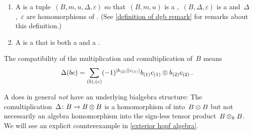 \documentclass[a4paper,10pt,headings=standardclasses]{scrartcl}
\begin{document}
\begin{definition}
  \label{definition of dgb}
  \leavevmode
  \begin{enumerate}
    \item
      A  is a tuple~$(B, m, u, \Delta, \varepsilon)$ so that~$(B, m, u)$ is a {\dga},~$(B, \Delta, \varepsilon)$ is a {\dgc} and~$\Delta$,~$\varepsilon$ are homomorphisms of {\dgas}.
      (See \cref{definition of dgb remark} for remarks about this definition.)
    \item
      A  is a {\dgsub} that is both a {\dgi} and a {\dgci}.
  \end{enumerate}
\end{definition}

\begin{remark}
  The compatibility of the multiplication and comultiplication of~$B$ means
  \begin{gather*}
    \Delta(bc)
    =
    \sum_{(b), (c)}
    (-1)^{\lvert b_{(2)}\rvert \lvert c_{(1)}\rvert}
    b_{(1)} c_{(1)} \otimes b_{(2)} c_{(2)} \,.
  \end{gather*}
\end{remark}


\begin{warning}
  A {\dgb} does in general \emph{not} have an underlying bialgebra structure:
  The comultiplication~$\Delta \colon B \to B \otimes B$ is a homomorphism of {\dgas} into~$B \otimes B$ but not necessarily an algebra homomorphism into the sign-less tensor product~$B \otimes_k B$.
  We will see an explicit counterexample in \cref{exterior hopf algebra}.
\end{warning}
\end{document}
